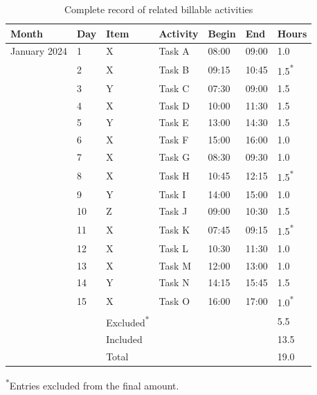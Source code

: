 \documentclass[
  11pt,
  a4paper,
  UKenglish,
  ]{article}
\begin{document}
\label{timesheet}
\begin{table}[t]
\centering
\caption{\label{tab:timesheet}Complete record of related billable activities}
\centering
\fontsize{8}{10}\selectfont
\begin{threeparttable}
\begin{tabular}[t]{lllllll}
\toprule
Month & Day & Item & Activity & Begin & End & Hours\\
\midrule
January 2024 & 1 & X & Task A & 08:00 & 09:00 & 1.0\\

 & 2 & X & Task B & 09:15 & 10:45 & 1.5\textsuperscript{*}\\

 & 3 & Y & Task C & 07:30 & 09:00 & 1.5\\

 & 4 & X & Task D & 10:00 & 11:30 & 1.5\\

 & 5 & Y & Task E & 13:00 & 14:30 & 1.5\\

 & 6 & X & Task F & 15:00 & 16:00 & 1.0\\

 & 7 & X & Task G & 08:30 & 09:30 & 1.0\\

 & 8 & X & Task H & 10:45 & 12:15 & 1.5\textsuperscript{*}\\

 & 9 & Y & Task I & 14:00 & 15:00 & 1.0\\

 & 10 & Z & Task J & 09:00 & 10:30 & 1.5\\

 & 11 & X & Task K & 07:45 & 09:15 & 1.5\textsuperscript{*}\\

 & 12 & X & Task L & 10:30 & 11:30 & 1.0\\

 & 13 & X & Task M & 12:00 & 13:00 & 1.0\\

 & 14 & Y & Task N & 14:15 & 15:45 & 1.5\\

 & 15 & X & Task O & 16:00 & 17:00 & 1.0\textsuperscript{*}\\

\midrule
 &  & Excluded\textsuperscript{*} &  &  &  & 5.5\\

 &  & Included &  &  &  & 13.5\\

 &  & Total &  &  &  & 19.0\\
\bottomrule
\end{tabular}
\begin{tablenotes}[para]
\item \textsuperscript{*}Entries excluded from the final amount.
\end{tablenotes}
\end{threeparttable}
\end{table}
\end{document}
